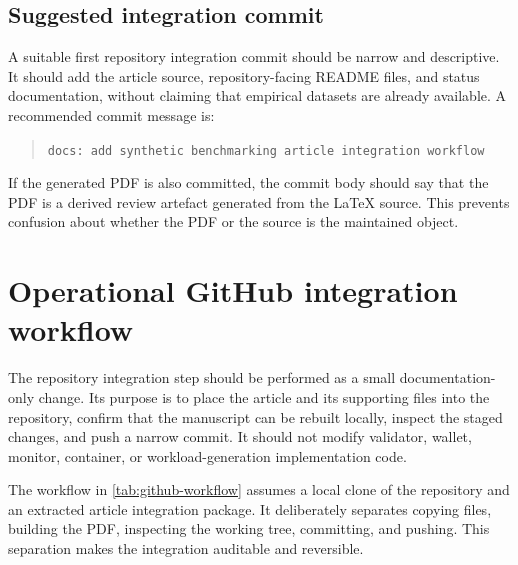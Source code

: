 \documentclass[11pt,a4paper]{article}
\begin{document}
\subsection{Suggested integration commit}
\label{subsec:integration-commit}

A suitable first repository integration commit should be narrow and descriptive. It should add the article source, repository-facing README files, and status documentation, without claiming that empirical datasets are already available. A recommended commit message is:

\begin{quote}\small
\texttt{docs: add synthetic benchmarking article integration workflow}
\end{quote}

If the generated PDF is also committed, the commit body should say that the PDF is a derived review artefact generated from the LaTeX source. This prevents confusion about whether the PDF or the source is the maintained object.

\section{Operational GitHub integration workflow}
\label{sec:github-workflow}

The repository integration step should be performed as a small documentation-only change. Its purpose is to place the article and its supporting files into the repository, confirm that the manuscript can be rebuilt locally, inspect the staged changes, and push a narrow commit. It should not modify validator, wallet, monitor, container, or workload-generation implementation code.

The workflow in \cref{tab:github-workflow} assumes a local clone of the repository and an extracted article integration package. It deliberately separates copying files, building the PDF, inspecting the working tree, committing, and pushing. This separation makes the integration auditable and reversible.
\end{document}
